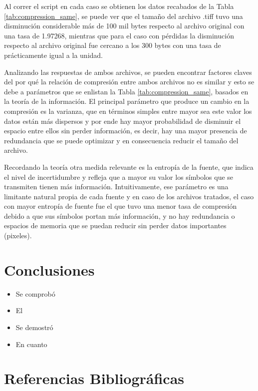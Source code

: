 \documentclass[conference,onecolumn,12pt]{IEEEtran}
\numberwithin{equation}{subsection}
\begin{document}
Al correr el script en cada caso se obtienen los datos recabados de la Tabla \ref{tab:compression_same}, se puede ver que el tamaño del archivo .tiff tuvo una disminución considerable más de 100 mil bytes respecto al archivo original con una tasa de 1.97268, mientras que para el caso con pérdidas la disminución respecto al archivo original fue cercano a los 300 bytes con una tasa de prácticamente igual a la unidad.

Analizando las respuestas de ambos archivos, se pueden encontrar factores claves del por qué la relación de compresión entre ambos archivos no es similar y esto se debe a parámetros que se enlistan la Tabla \ref{tab:compression_same}, basados en la teoría de la información. El principal parámetro que produce un cambio en la compresión es la varianza, que en términos simples entre mayor sea este valor los datos están más dispersos y por ende hay mayor probabilidad de disminuir el espacio entre ellos sin perder información, es decir, hay una mayor presencia de redundancia que se puede optimizar y en consecuencia reducir el tamaño del archivo.

Recordando la teoría otra medida relevante es la entropía de la fuente, que indica el nivel de incertidumbre y refleja que a mayor su valor los símbolos que se transmiten tienen más información. Intuitivamente, ese parámetro es una limitante natural propia de cada fuente y en caso de los archivos tratados, el caso con mayor entropía de fuente fue el que tuvo una menor tasa de compresión debido a que sus símbolos portan más información, y no hay redundancia o espacios de memoria que se puedan reducir sin perder datos importantes (pixeles)\cite{Stone_2022}.
\section{Conclusiones} 

\begin{itemize}

\item Se comprobó 

\item El 

\item Se demostró 

\item  En cuanto

\end{itemize}


\section{Referencias Bibliográficas}
\printbibliography[heading=none]
\end{document}
